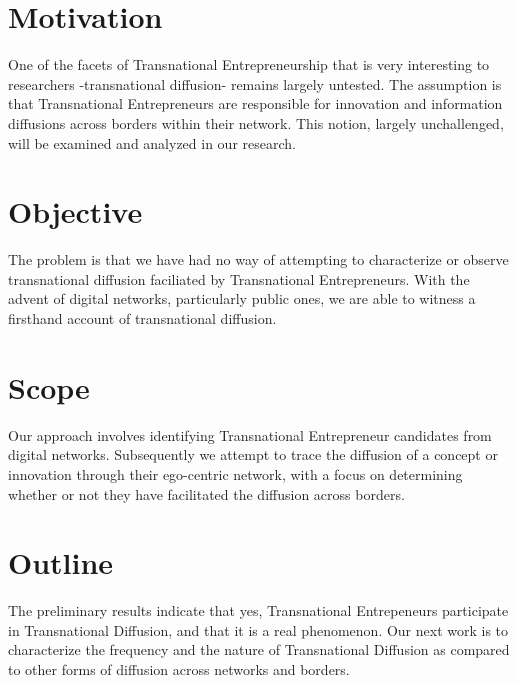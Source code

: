 \section{Motivation}
One of the facets of Transnational Entrepreneurship that is very interesting to researchers -transnational diffusion- remains largely untested. The assumption is that Transnational Entrepreneurs are responsible for innovation and information diffusions across borders within their network. This notion, largely unchallenged, will be examined and analyzed in our research.

\section{Objective}
The problem is that we have had no way of attempting to characterize or observe transnational diffusion faciliated by Transnational Entrepreneurs. With the advent of digital networks, particularly public ones, we are able to witness a firsthand account of transnational diffusion.

\section{Scope}
Our approach involves identifying Transnational Entrepreneur candidates from digital networks. Subsequently we attempt to trace the diffusion of a concept or innovation through their ego-centric network, with a focus on determining whether or not they have facilitated the diffusion across borders.

\section{Outline}
The preliminary results indicate that yes, Transnational Entrepeneurs participate in Transnational Diffusion, and that it is a real phenomenon. Our next work is to characterize the frequency and the nature of Transnational Diffusion as compared to other forms of diffusion across networks and borders.

